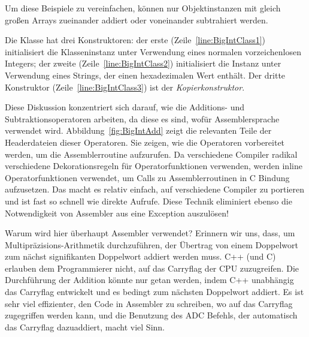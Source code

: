 Um diese Beispiele zu vereinfachen, k\"{o}nnen nur Objektinstanzen mit
gleich gro{\ss}en Arrays zueinander addiert oder voneinander subtrahiert
werden.

Die Klasse hat drei Konstruktoren: der erste
(Zeile~\ref{line:BigIntClass1}) initialisiert die Klasseninstanz
unter Verwendung eines normalen vorzeichenlosen Integers; der zweite
(Zeile~\ref{line:BigIntClass2}) initialisiert die Instanz unter
Verwendung eines Strings, der einen hexadezimalen Wert enth\"{a}lt. Der
dritte Konstruktor (Zeile~\ref{line:BigIntClass3}) ist der
\emph{Kopierkonstruktor}. 

Diese Diskussion konzentriert sich darauf, wie die Additions- und
Subtraktionsoperatoren arbeiten, da diese es sind, wof\"{u}r
Assemblersprache verwendet wird. Abbildung~\ref{fig:BigIntAdd} zeigt
die relevanten Teile der Headerdateien dieser Operatoren. Sie
zeigen, wie die Operatoren vorbereitet werden, um die
Assemblerroutine aufzurufen. Da verschiedene Compiler radikal
verschiedene Dekorationsregeln f\"{u}r Operatorfunktionen verwenden,
werden inline Operatorfunktionen verwendet, um Calls zu
Assemblerroutinen in C Bindung aufzusetzen. Das macht es relativ
einfach, auf verschiedene Compiler zu portieren und ist fast so
schnell wie direkte Aufrufe. Diese Technik eliminiert ebenso die
Notwendigkeit von Assembler aus eine Exception auszul\"{o}sen!

Warum wird hier \"{u}berhaupt Assembler verwendet? Erinnern wir uns,
dass, um Multipr\"{a}zisions-Arithmetik durchzuf\"{u}hren, der \"{U}bertrag von
einem Doppelwort zum n\"{a}chst signifikanten Doppelwort addiert werden
muss. C++ (und C) erlauben dem Programmierer nicht, auf das
Carryflag der CPU zuzugreifen. Die Durchf\"{u}hrung der Addition k\"{o}nnte
nur getan werden, indem C++ unabh\"{a}ngig das Carryflag entwickelt und
es bedingt zum n\"{a}chsten Doppelwort addiert. Es ist sehr viel
effizienter, den Code in Assembler zu schreiben, wo auf das
Carryflag zugegriffen werden kann, und die Benutzung des {\code ADC}
Befehls, der automatisch das Carryflag dazuaddiert, macht viel Sinn.

